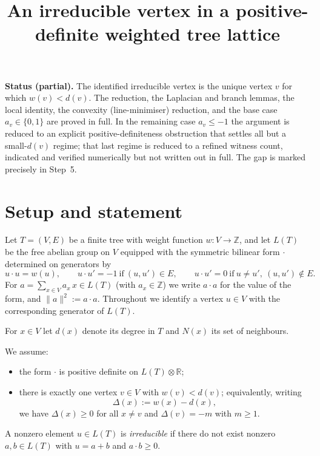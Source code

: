 \documentclass[11pt]{article}
\newcommand{\bZ}{\mathbb{Z}}
\newcommand{\bR}{\mathbb{R}}
\theoremstyle{definition}
\begin{document}
\title{An irreducible vertex in a positive-definite weighted tree lattice}
\author{}
\date{}
\maketitle

\noindent\textbf{Status (partial).} The identified irreducible vertex is the unique
vertex $v$ for which $w(v)<d(v)$. The reduction, the Laplacian and branch lemmas, the
local identity, the convexity (line-minimiser) reduction, and the base case
$a_v\in\{0,1\}$ are proved in full. In the remaining case $a_v\le-1$ the argument is
reduced to an explicit positive-definiteness obstruction that settles all but a
small-$d(v)$ regime; that last regime is reduced to a refined witness count, indicated
and verified numerically but not written out in full. The gap is marked precisely in
Step~5.

\section{Setup and statement}

Let $T=(V,E)$ be a finite tree with weight function $w\colon V\to\bZ$, and let
$L(T)$ be the free abelian group on $V$ equipped with the symmetric bilinear form
$\cdot$ determined on generators by
\[
u\cdot u=w(u),\qquad u\cdot u'=-1\ \text{if}\ (u,u')\in E,\qquad u\cdot u'=0\ \text{if}\ u\neq u',\ (u,u')\notin E .
\]
For $a=\sum_{x\in V}a_x\,x\in L(T)$ (with $a_x\in\bZ$) we write $a\cdot a$ for the value
of the form, and $\|a\|^2:=a\cdot a$. Throughout we identify a vertex $u\in V$ with
the corresponding generator of $L(T)$.

For $x\in V$ let $d(x)$ denote its degree in $T$ and $N(x)$ its set of neighbours.

We assume:
\begin{itemize}
  \item[(H1)] the form $\cdot$ is positive definite on $L(T)\otimes\bR$;
  \item[(H2)] there is exactly one vertex $v\in V$ with $w(v)<d(v)$; equivalently, writing
  \[
  \Delta(x):=w(x)-d(x),
  \]
  we have $\Delta(x)\ge 0$ for all $x\neq v$ and $\Delta(v)=-m$ with $m\ge 1$.
\end{itemize}

\begin{definition}
A nonzero element $u\in L(T)$ is \emph{irreducible} if there do not exist nonzero
$a,b\in L(T)$ with $u=a+b$ and $a\cdot b\ge 0$.
\end{definition}
\end{document}
